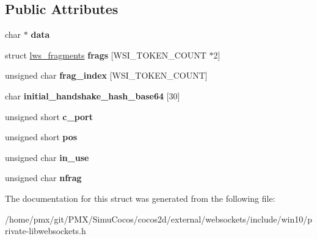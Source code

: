 \subsection*{Public Attributes}
\begin{DoxyCompactItemize}
\item 
\mbox{\label{structallocated__headers_a6875492d3f53c85e47f507c5d95dab6c}} 
char $\ast$ {\bfseries data}
\item 
\mbox{\label{structallocated__headers_a94624e580299bcf4603358cacd5fbe61}} 
struct \hyperlink{structlws__fragments}{lws\+\_\+fragments} {\bfseries frags} \mbox{[}W\+S\+I\+\_\+\+T\+O\+K\+E\+N\+\_\+\+C\+O\+U\+NT $\ast$2\mbox{]}
\item 
\mbox{\label{structallocated__headers_a2ae2bf1729ffe5866d6a9ac172f50c2b}} 
unsigned char {\bfseries frag\+\_\+index} \mbox{[}W\+S\+I\+\_\+\+T\+O\+K\+E\+N\+\_\+\+C\+O\+U\+NT\mbox{]}
\item 
\mbox{\label{structallocated__headers_a96493a7d2d9e9aad7c54298f40258cd1}} 
char {\bfseries initial\+\_\+handshake\+\_\+hash\+\_\+base64} \mbox{[}30\mbox{]}
\item 
\mbox{\label{structallocated__headers_ac91e095ce0cb00123a92b119f713983b}} 
unsigned short {\bfseries c\+\_\+port}
\item 
\mbox{\label{structallocated__headers_a59a8b031d6bb3d689f7a5813be293a9e}} 
unsigned short {\bfseries pos}
\item 
\mbox{\label{structallocated__headers_a32967599c944ea15d43cb98c339d4ee5}} 
unsigned char {\bfseries in\+\_\+use}
\item 
\mbox{\label{structallocated__headers_ae926d349b8f73e67c37605dd5e85afb9}} 
unsigned char {\bfseries nfrag}
\end{DoxyCompactItemize}


The documentation for this struct was generated from the following file\+:\begin{DoxyCompactItemize}
\item 
/home/pmx/git/\+P\+M\+X/\+Simu\+Cocos/cocos2d/external/websockets/include/win10/private-\/libwebsockets.\+h\end{DoxyCompactItemize}
